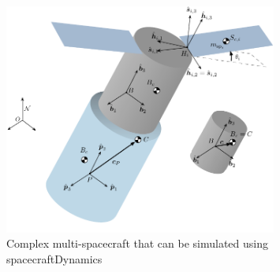 \begin{figure}[htbp]
	\centerline{
		\includegraphics[width=0.8\textwidth]{Figures/multiSC}}
	\caption{Complex multi-spacecraft that can be simulated using spacecraftDynamics}
	\label{fig:FlexSloshFigure}
\end{figure}
